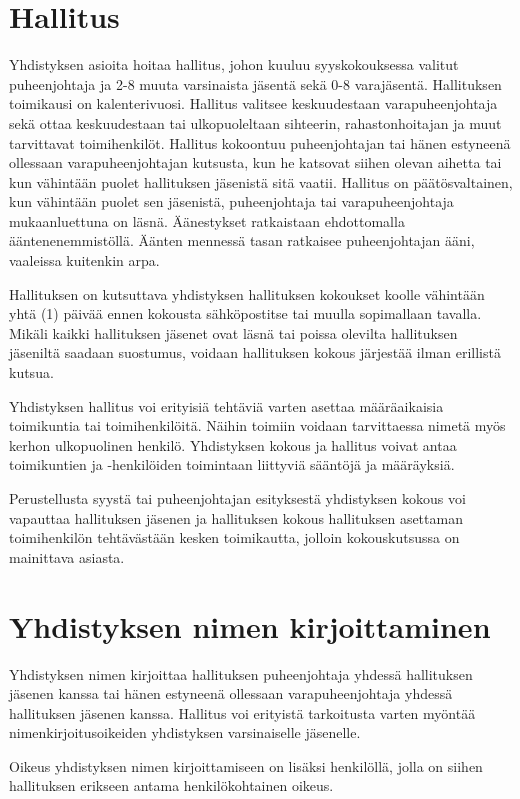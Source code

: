 \documentclass[a4paper, 12pt, finnish]{scrartcl}
\begin{document}
\section{Hallitus}
Yhdistyksen asioita hoitaa hallitus, johon kuuluu syyskokouksessa valitut puheenjohtaja ja 2-8 muuta varsinaista jäsentä sekä 0-8 varajäsentä.
Hallituksen toimikausi on kalenterivuosi.
Hallitus valitsee keskuudestaan varapuheenjohtaja sekä ottaa keskuudestaan tai ulkopuoleltaan sihteerin, rahastonhoitajan ja muut tarvittavat toimihenkilöt.
Hallitus kokoontuu puheenjohtajan tai hänen estyneenä ollessaan varapuheenjohtajan kutsusta, kun he katsovat siihen olevan aihetta tai kun vähintään puolet hallituksen jäsenistä sitä vaatii.
Hallitus on päätösvaltainen, kun vähintään puolet sen jäsenistä, puheenjohtaja tai varapuheenjohtaja mukaanluettuna on läsnä.
Äänestykset ratkaistaan ehdottomalla ääntenenemmistöllä.
Äänten mennessä tasan ratkaisee puheenjohtajan ääni, vaaleissa kuitenkin arpa.

Hallituksen on kutsuttava yhdistyksen hallituksen kokoukset koolle vähintään yhtä (1) päivää ennen kokousta sähköpostitse tai muulla sopimallaan tavalla.
Mikäli kaikki hallituksen jäsenet ovat läsnä tai poissa olevilta hallituksen jäseniltä saadaan suostumus, voidaan hallituksen kokous järjestää ilman erillistä kutsua.

Yhdistyksen hallitus voi erityisiä tehtäviä varten asettaa määräaikaisia toimikuntia tai toimihenkilöitä.
Näihin toimiin voidaan tarvittaessa nimetä myös kerhon ulkopuolinen henkilö.
Yhdistyksen kokous ja hallitus voivat antaa toimikuntien ja -henkilöiden toimintaan liittyviä sääntöjä ja määräyksiä.

Perustellusta syystä tai puheenjohtajan esityksestä yhdistyksen kokous voi vapauttaa hallituksen jäsenen ja hallituksen kokous hallituksen asettaman toimihenkilön tehtävästään kesken toimikautta, jolloin kokouskutsussa on mainittava asiasta.

\section{Yhdistyksen nimen kirjoittaminen}
Yhdistyksen nimen kirjoittaa hallituksen puheenjohtaja yhdessä hallituksen jäsenen kanssa tai hänen estyneenä ollessaan varapuheenjohtaja yhdessä hallituksen jäsenen kanssa.
Hallitus voi erityistä tarkoitusta varten myöntää nimenkirjoitusoikeiden yhdistyksen varsinaiselle jäsenelle.

Oikeus yhdistyksen nimen kirjoittamiseen on lisäksi henkilöllä, jolla on siihen hallituksen erikseen antama henkilökohtainen oikeus.
\end{document}
